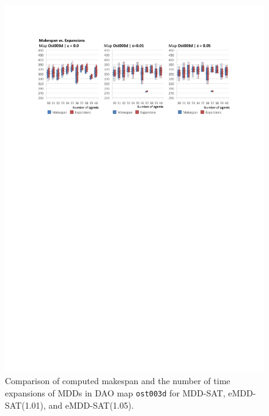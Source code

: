 \documentclass[jair,oneside,11pt]{article}
\begin{document}
\begin{figure}[h]
\centering
\includegraphics[trim={2.5cm 20.8cm 2.5cm 2.7cm},clip,width=1.0\textwidth]{expr_maps-make-expand_ost003d.pdf}
\vspace{-0.6cm}\caption{Comparison of computed makespan and the number of time expansions of MDDs in DAO map \texttt{ost003d} for MDD-SAT, eMDD-SAT(1.01), and eMDD-SAT(1.05).}
\label{figure-make-expand-maps_ost003d}
\end{figure}


\end{document}
